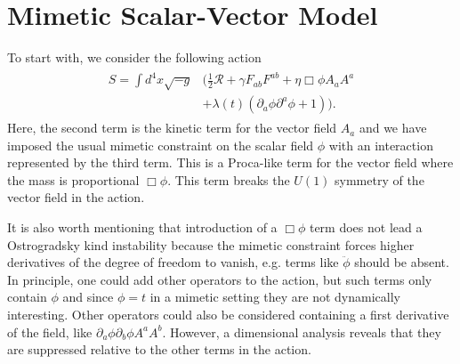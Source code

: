 \documentclass[%
 reprint,
 amsmath,amssymb,
 aps,
]{revtex4-1}
\begin{document}
\section{Mimetic Scalar-Vector Model}

To start with, we consider the following action
\begin{eqnarray}\label{action}
\begin{split}
S=\int d^4x \sqrt{-g} &\biggl(\frac{1}{2}\mathcal{R}+\gamma F_{ab}F^{ab}+\eta\Box\phi A_aA^a\\
&+\lambda(t)(\partial_a\phi\partial^a\phi+1)\biggr).
\end{split}
\end{eqnarray}
Here, the second term is the kinetic term for the vector field $A_a$ and we have imposed the usual mimetic constraint on the scalar field $\phi$ with an interaction represented by the third term. This is a Proca-like term for the vector field where the mass is proportional $\Box{\phi}$. This term breaks the $U(1)$ symmetry of the vector field in the action.

It is also worth mentioning that introduction of a $\Box \phi$ term does not lead a Ostrogradsky kind instability because the mimetic constraint forces higher derivatives of the degree of freedom to vanish, e.g. terms like $\ddot{\phi}$ should be absent. In principle, one could add other operators to the action, but such terms only  contain $\phi$ and since $\phi=t$ in a mimetic setting they are not dynamically interesting. Other operators could also be considered containing a first derivative of the field, like $\partial_a\phi\partial_b\phi A^aA^b$.  However, a dimensional analysis reveals that they are suppressed relative to the other terms in the action.
\end{document}
